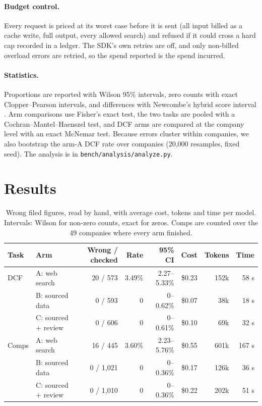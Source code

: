 \documentclass[10pt,a4paper]{article}
\begin{document}
\paragraph{Budget control.} Every request is priced at its worst case before it is sent (all input billed as a cache
write, full output, every allowed search) and refused if it could cross a hard cap recorded in a ledger. The SDK's
own retries are off, and only non-billed overload errors are retried, so the spend reported is the spend incurred.

\paragraph{Statistics.} Proportions are reported with Wilson 95\% intervals, zero counts with exact Clopper--Pearson
intervals, and differences with Newcombe's hybrid score interval \citep{wilson1927,clopper1934,newcombe1998}. Arm
comparisons use Fisher's exact test, the two tasks are pooled with a Cochran--Mantel--Haenszel test, and DCF arms are
compared at the company level with an exact McNemar test. Because errors cluster within companies, we also bootstrap
the arm-A DCF rate over companies (20{,}000 resamples, fixed seed). The analysis is in
\texttt{bench/analysis/analyze.py}.

\section{Results}

\begin{table}[htb]
\centering
\small
\begin{tabular}{llrrrrrr}
\toprule
Task & Arm & Wrong / checked & Rate & 95\% CI & Cost & Tokens & Time \\
\midrule
DCF   & A: web search      & 20 / 573   & 3.49\% & 2.27--5.33\% & \$0.23 & 152k & 58 s \\
      & B: sourced data    & 0 / 593    & 0      & 0--0.62\%    & \$0.07 & 38k  & 18 s \\
      & C: sourced + review& 0 / 606    & 0      & 0--0.61\%    & \$0.10 & 69k  & 32 s \\
\midrule
Comps & A: web search      & 16 / 445   & 3.60\% & 2.23--5.76\% & \$0.55 & 601k & 167 s \\
      & B: sourced data    & 0 / 1{,}021& 0      & 0--0.36\%    & \$0.17 & 126k & 36 s \\
      & C: sourced + review& 0 / 1{,}010& 0      & 0--0.36\%    & \$0.22 & 202k & 51 s \\
\bottomrule
\end{tabular}
\caption{Wrong filed figures, read by hand, with average cost, tokens and time per model. Intervals: Wilson for
non-zero counts, exact for zeros. Comps are counted over the 49 companies where every arm finished.}
\label{tab:main}
\end{table}
\end{document}
